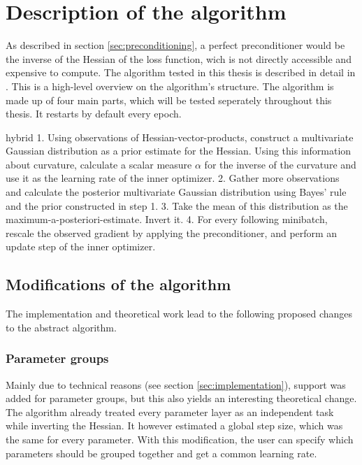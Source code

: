 \documentclass[twoside,12pt,a4paper]{report}
\begin{document}
\section{Description of the algorithm}
As described in section \ref{sec:preconditioning}, a perfect preconditioner would be the inverse of the Hessian of the loss function, wich is not directly accessible and expensive to compute.
The algorithm tested in this thesis is described in detail in \cite{roos2019active}.
This is a high-level overview on the algorithm's structure.
The algorithm is made up of four main parts, which will be tested seperately throughout this thesis.
It restarts by default every epoch.
\begin{markdown*}{hybrid}
1. Using observations of Hessian-vector-products, construct a multivariate Gaussian distribution as a prior estimate for the Hessian. Using this information about curvature, calculate a scalar measure $\alpha$ for the inverse of the curvature and use it as the learning rate of the inner optimizer.
2. Gather more observations and calculate the posterior multivariate Gaussian distribution using Bayes' rule and the prior constructed in step 1.
3. Take the mean of this distribution as the maximum-a-posteriori-estimate. Invert it.
4. For every following minibatch, rescale the observed gradient by applying the preconditioner, and perform an update step of the inner optimizer.
\end{markdown*}


\subsection{Modifications of the algorithm}\label{sec:modifications}
The implementation and theoretical work lead to the following proposed changes to the abstract algorithm.

\subsubsection{Parameter groups}
Mainly due to technical reasons (see section \ref{sec:implementation}), support was added for parameter groups, but this also yields an interesting theoretical change. The algorithm already treated every parameter layer as an independent task while inverting the Hessian. It however estimated a global step size, which was the same for every parameter. With this modification, the user can specify which parameters should be grouped together and get a common learning rate.
\end{document}
